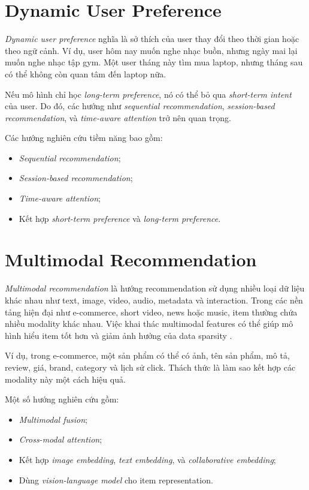\documentclass[12pt,a4paper]{article}
\begin{document}
\section{Dynamic User Preference}

\textit{Dynamic user preference} nghĩa là sở thích của user thay đổi theo thời gian hoặc theo ngữ cảnh. 
Ví dụ, user hôm nay muốn nghe nhạc buồn, nhưng ngày mai lại muốn nghe nhạc tập gym. 
Một user tháng này tìm mua laptop, nhưng tháng sau có thể không còn quan tâm đến laptop nữa.

Nếu mô hình chỉ học \textit{long-term preference}, nó có thể bỏ qua \textit{short-term intent} của user. 
Do đó, các hướng như \textit{sequential recommendation}, \textit{session-based recommendation}, và \textit{time-aware attention} trở nên quan trọng.

Các hướng nghiên cứu tiềm năng bao gồm:

\begin{itemize}[leftmargin=*]
    \item \textit{Sequential recommendation};
    \item \textit{Session-based recommendation};
    \item \textit{Time-aware attention};
    \item Kết hợp \textit{short-term preference} và \textit{long-term preference}.
\end{itemize}

\section{Multimodal Recommendation}

\textit{Multimodal recommendation} là hướng recommendation sử dụng nhiều loại dữ liệu khác nhau như text, image, video, audio, metadata và interaction. 
Trong các nền tảng hiện đại như e-commerce, short video, news hoặc music, item thường chứa nhiều modality khác nhau. 
Việc khai thác multimodal features có thể giúp mô hình hiểu item tốt hơn và giảm ảnh hưởng của data sparsity \cite{wei2023multimodal}.

Ví dụ, trong e-commerce, một sản phẩm có thể có ảnh, tên sản phẩm, mô tả, review, giá, brand, category và lịch sử click. 
Thách thức là làm sao kết hợp các modality này một cách hiệu quả.

Một số hướng nghiên cứu gồm:

\begin{itemize}[leftmargin=*]
    \item \textit{Multimodal fusion};
    \item \textit{Cross-modal attention};
    \item Kết hợp \textit{image embedding}, \textit{text embedding}, và \textit{collaborative embedding};
    \item Dùng \textit{vision-language model} cho item representation.
\end{itemize}
\end{document}

